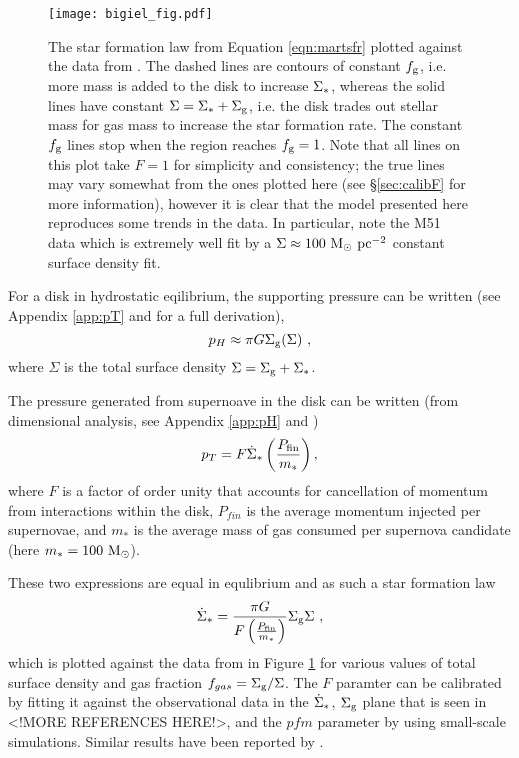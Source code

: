 \begin{figure}
    \centering
    \texttt{[image: bigiel\_fig.pdf]}
    \caption{The star formation law from Equation \ref{eqn:martsfr} plotted against the data from \citet{bigiel_star_2008}. The dashed lines are contours of constant $f_\mathrm{g}$, i.e. more mass is added to the disk to increase $\Sigma_*$, whereas the solid lines have constant $\Sigma = \Sigma_* + \Sigma_\mathrm{g}$, i.e. the disk trades out stellar mass for gas mass to increase the star formation rate. The constant $f_\mathrm{g}$ lines stop when the region reaches $f_\mathrm{g}=1$. Note that all lines on this plot take $F=1$ for simplicity and consistency; the true lines may vary somewhat from the ones plotted here (see \S \ref{sec:calibF} for more information), however it is clear that the model presented here reproduces some trends in the data. In particular, note the M51 data which is extremely well fit by a $\Sigma \approx 100 ~\mathrm{M}_{\odot} ~\mathrm{pc}^{-2}$ constant surface density fit.}
    \label{fig:bigielwithmart}
\end{figure}

For a disk in hydrostatic eqilibrium, the supporting pressure can be written (see Appendix \ref{app:pT} and \citet{ostriker_maximally_2011} for a full derivation),
\begin{equation}
\label{eqn:hydeq}
p_H \approx \pi G \Sigma_\mathrm{g} (\Sigma)~,
\end{equation}
where $\Sigma$ is the total surface density $\Sigma = \Sigma_\mathrm{g} + \Sigma_*$.

The pressure generated from supernoave in the disk can be written (from dimensional analysis, see Appendix \ref{app:pH} and \citet{martizzi_supernova_2015})
\begin{equation}
\label{eqn:turb}
p_T = F \dot{\Sigma}_* \left(\frac{P_\mathrm{fin}}{m_*}\right),
\end{equation}
where $F$ is a factor of order unity that accounts for cancellation of momentum from interactions within the disk, $P_{fin}$ is the average momentum injected per supernovae, and $m_*$ is the average mass of gas consumed per supernova candidate (here $m_* = 100 ~\mathrm{M}_{\odot}$).

These two expressions are equal in equlibrium and as such a star formation law
\begin{equation}
\label{eqn:martsfr}
\dot{\Sigma}_* = \frac{\pi G}{F \left(\frac{P_\mathrm{fin}}{m_*}\right)} \Sigma_\mathrm{g} \Sigma~,
\end{equation}
which is plotted against the data from \citet{bigiel_star_2008} in Figure \ref{fig:bigielwithmart} for various values of total surface density and gas fraction $f_{gas} = \Sigma_\mathrm{g}/\Sigma$.
The $F$ paramter can be calibrated by fitting it against the observational data in the $\dot{\Sigma}_*$, $\Sigma_\mathrm{g}$ plane that is seen in \citet{bigiel_star_2008} <!MORE REFERENCES HERE!>, and the $pfm$ parameter by using small-scale simulations.
Similar results have been reported by \citep{ostriker_maximally_2011}.
